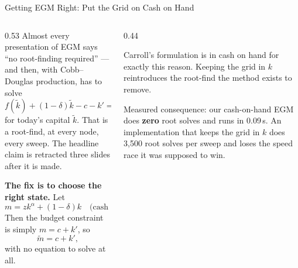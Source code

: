 \begin{frame}{Getting EGM Right: Put the Grid on Cash on Hand}
\begin{columns}[T]
\begin{column}{0.53\textwidth}
\small
Almost every presentation of EGM says ``no root-finding required'' --- and then, with Cobb--Douglas production, has to solve
\[
  f(\tilde k)+(1-\delta)\tilde k-c-k'=0
\]
for today's capital $\tilde k$. That is a root-find, at every node, every sweep. The headline claim is retracted three slides after it is made.
\medskip

\textbf{The fix is to choose the right state.} Let
\[
  m=z k^{\alpha}+(1-\delta)k \quad\text{(cash on hand)} .
\]
Then the budget constraint is simply $m=c+k'$, so
\[
  \tilde m = c + k' ,
\]
with no equation to solve at all.
\end{column}
\begin{column}{0.44\textwidth}
\begin{takeawaybox}[title=\textbf{Why this is the real method}]\small
Carroll's formulation is in cash on hand for exactly this reason. Keeping the grid in $k$ reintroduces the root-find the method exists to remove.
\end{takeawaybox}
\medskip
\begin{cautionbox}\footnotesize
Measured consequence: our cash-on-hand EGM does \textbf{zero} root solves and runs in 0.09\,s. An implementation that keeps the grid in $k$ does 3{,}500 root solves per sweep and loses the speed race it was supposed to win.
\end{cautionbox}
\end{column}
\end{columns}
\end{frame}

